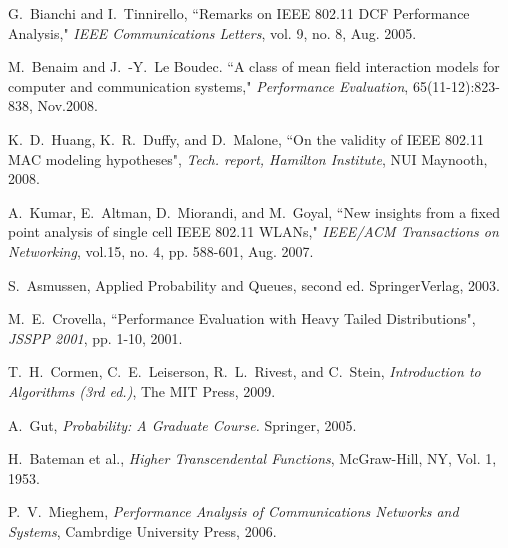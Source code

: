 \documentclass[journal]{IEEEtran}
\begin{document}
\begin{thebibliography}{1}
G.~Bianchi and I.~Tinnirello, ``Remarks on IEEE 802.11 DCF Performance Analysis," \emph{IEEE Communications Letters}, vol. 9, no. 8, Aug. 2005.

M.~Benaim and J.~-Y.~Le Boudec. ``A class of mean field interaction models for computer and communication systems," \emph{Performance Evaluation}, 65(11-12):823-838, Nov.2008.

K.~D.~Huang, K.~R.~Duffy, and D.~Malone, ``On the validity of IEEE 802.11 MAC modeling hypotheses", \emph{Tech. report, Hamilton Institute}, NUI Maynooth, 2008.

A.~Kumar, E.~Altman, D.~Miorandi, and M.~Goyal, ``New insights from a fixed point analysis of single cell IEEE 802.11 WLANs," \emph{IEEE/ACM Transactions on Networking}, vol.15, no. 4, pp. 588-601, Aug. 2007.

S.~Asmussen, Applied Probability and Queues, second ed. SpringerVerlag, 2003.

M.~E.~Crovella, ``Performance Evaluation with Heavy Tailed Distributions", \emph{JSSPP 2001}, pp. 1-10, 2001.

T.~H.~Cormen, C.~E.~Leiserson, R.~L.~Rivest, and C.~Stein, \emph{Introduction to Algorithms (3rd ed.)}, The MIT Press, 2009.

A.~Gut, \emph{Probability: A Graduate Course.} Springer, 2005.

H.~Bateman et al., \emph{Higher Transcendental Functions}, McGraw-Hill, NY, Vol. 1, 1953.

P.~V.~Mieghem, \emph{Performance Analysis of Communications Networks and Systems}, Cambrdige University Press, 2006.


\end{thebibliography}
\end{document}
